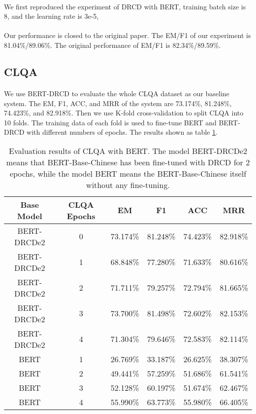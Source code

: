 \documentclass{article}
\begin{document}
\paragraph{}
We first reproduced the experiment of DRCD with BERT, training batch size is 8, and the learning rate is 3e-5,

\paragraph{}
Our performance is closed to the original paper. The EM/F1 of our experiment is 81.04\%/89.06\%. The original performance of EM/F1 is 82.34\%/89.59\%.

\subsection{CLQA}
\paragraph{}
We use BERT-DRCD to evaluate the whole CLQA dataset as our baseline system. The EM, F1, ACC, and MRR of the system are 73.174\%, 81.248\%, 74.423\%, and 82.918\%. Then we use K-fold cross-validation to split CLQA into 10 folds. The training data of each fold is used to fine-tune BERT and BERT-DRCD with different numbers of epochs. The results shown as table \ref{tab:bert-clqa}.

\begin{table}[ht!]
  \centering
  \begin{tabular}{cccccc}
    Base Model & CLQA Epochs & EM & F1 & ACC & MRR\\
    \toprule
    BERT-DRCDe2 & 0 & 73.174\% & 81.248\% & 74.423\% & 82.918\% \\
    BERT-DRCDe2 & 1 & 68.848\% & 77.280\% & 71.633\% & 80.616\% \\
    BERT-DRCDe2 & 2 & 71.711\% & 79.257\% & 72.794\% & 81.665\% \\
    BERT-DRCDe2 & 3 & 73.700\% & 81.498\% & 72.602\% & 82.153\% \\
    BERT-DRCDe2 & 4 & 71.304\% & 79.646\% & 72.583\% & 82.114\% \\
    BERT        & 1 & 26.769\% & 33.187\% & 26.625\% & 38.307\% \\
    BERT        & 2 & 49.441\% & 57.259\% & 51.686\% & 61.541\% \\
    BERT        & 3 & 52.128\% & 60.197\% & 51.674\% & 62.467\% \\
    BERT        & 4 & 55.990\% & 63.773\% & 55.980\% & 66.405\% \\
  \end{tabular}
  \caption{Evaluation results of CLQA with BERT. The model BERT-DRCDe2 means that BERT-Base-Chinese has been fine-tuned with DRCD for 2 epochs, while the model BERT means the BERT-Base-Chinese itself without any fine-tuning.}
  \label{tab:bert-clqa}
\end{table}
\end{document}
